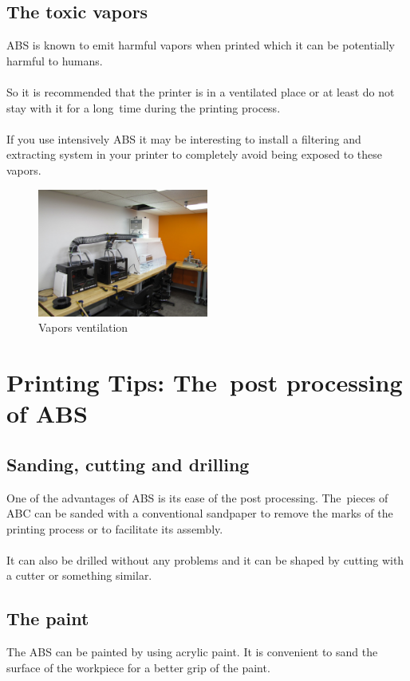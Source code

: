 \documentclass[11pt,a4paper]{article}
\begin{document}
	\subsection{The toxic vapors}ABS is known to emit harmful vapors when printed which it can be potentially harmful to humans.
\\\\
So it is recommended that the printer is in a ventilated place or at least do not stay with it for a long time during the printing process.
\\\\
If you use intensively ABS it may be interesting to install a filtering and extracting system in your printer to completely avoid being exposed to these vapors.
\begin{figure}[H]
\centering
\includegraphics[width=0.5\textwidth,cfbox=azul_marcos 4pt 0pt]{FOTOS/VENTILACIONVAPORES}
\caption*{Vapors ventilation}
\end{figure}
\section{Printing Tips: The post processing of ABS}
	\subsection{Sanding, cutting and drilling}One of the advantages of ABS is its ease of the post processing. The pieces of ABC can be sanded with a conventional sandpaper to remove the marks of the printing process or to facilitate its assembly.
\\\\
It can also be drilled without any problems and it can be shaped by cutting with a cutter or something similar.
	\subsection{The paint}The ABS can be painted by using acrylic paint. It is convenient to sand the surface of the workpiece for a better grip of the paint.
\end{document}
